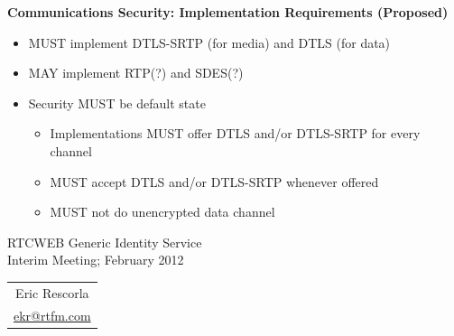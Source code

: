 \documentclass[helvetica]{seminar}
\newcommand{\heading}[1]{%
  \begin{center} 
    \large\bf 
    #1 
  \end{center} 
  \vspace{.4 in}}
\begin{document}
\begin{slide}
\heading{Communications Security: Implementation Requirements (Proposed)}

\begin{itemize}
\item MUST implement DTLS-SRTP (for media) and DTLS (for data) 
\item MAY implement RTP(?) and SDES(?)
\item Security MUST be default state
  \begin{itemize}
  \item Implementations MUST offer DTLS and/or DTLS-SRTP for every channel
  \item MUST accept DTLS and/or DTLS-SRTP whenever offered 
  \item MUST not do unencrypted data channel
  \end{itemize}
\end{itemize}

\end{slide}



\centerslidestrue

\begin{slide}
\begin{center}
\vspace{1 in}
\LARGE{{\bf}RTCWEB Generic Identity Service}\\
\vspace{.2in}
\large{{Interim Meeting; February 2012}} \\
\vspace{3em}
\large{
\begin{tabular}{c}
Eric Rescorla \\
\url{ekr@rtfm.com}
\end{tabular}
}
\end{center}

\end{slide}


\centerslidesfalse
\end{document}
